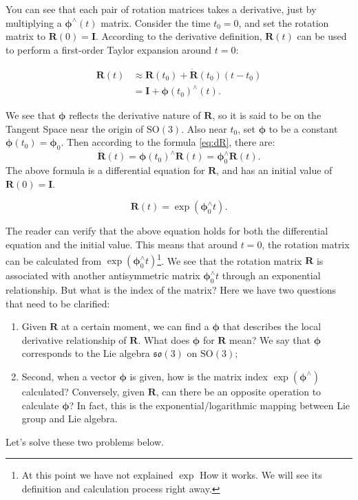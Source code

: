 You can see that each pair of rotation matrices takes a derivative, just by multiplying a $\boldsymbol{\phi}^\wedge (t)$ matrix. Consider the time $t_0=0$, and set the rotation matrix to $\bm{R}(0) = \bm{I}$. According to the derivative definition, $\bm{R}(t)$ can be used to perform a first-order Taylor expansion around $t=0$:

\begin{equation}
\begin{aligned}
\bm{R} \left( t \right) & \approx \bm{R} \left( t_0 \right) + \dot {\bm{R}} \left( {{t_0}} \right)\left ( {t - {t_0}} \right)\\
&= \bm{I} + \boldsymbol{\phi} {\left( {{t_0}} \right)^ \wedge } \left( t \right).
\end{aligned}
\end{equation}

We see that $\boldsymbol{\phi}$ reflects the derivative nature of $\bm{R}$, so it is said to be on the Tangent Space near the origin of $\mathrm{SO}(3)$. Also near $t_0$, set $\boldsymbol{\phi}$ to be a constant $\boldsymbol{\phi}(t_0) = \boldsymbol{\phi}_0$. Then according to the formula \eqref{eq:dR}, there are:
\[
\bm{ \dot{R} } (t) = \boldsymbol{\phi} (t_0) ^ {\wedge} \bm{R}(t) = \boldsymbol{\phi}_0^ {\wedge} \bm {R}(t).
\]
The above formula is a differential equation for $\bm{R}$, and has an initial value of $\bm{R}(0) = \bm{I}$.

\begin{equation}
\label{eq:so3ode}
\bm{R}(t) = \exp \left( \boldsymbol{\phi}_0^\wedge t \right).
\end{equation}

The reader can verify that the above equation holds for both the differential equation and the initial value. This means that around $t = 0$, the rotation matrix can be calculated from $\exp \left( \boldsymbol{\phi}_0^\wedge t \right)$\footnote{At this point we have not explained $\exp$ How it works. We will see its definition and calculation process right away. }. We see that the rotation matrix $\bm{R}$ is associated with another antisymmetric matrix $\boldsymbol{\phi}_0^\wedge t$ through an exponential relationship. But what is the index of the matrix? Here we have two questions that need to be clarified:

\begin{enumerate}
\item Given $\bm{R}$ at a certain moment, we can find a $\boldsymbol{\phi}$ that describes the local derivative relationship of $\bm{R}$. What does $\boldsymbol{\phi}$ for $\bm{R}$ mean? We say that $\boldsymbol{\phi}$ corresponds to the Lie algebra $\mathfrak{so}(3)$ on $\mathrm{SO}(3)$;
\item Second, when a vector $\boldsymbol{\phi}$ is given, how is the matrix index $\exp (\boldsymbol{\phi} ^\wedge )$ calculated? Conversely, given $\bm{R}$, can there be an opposite operation to calculate $\boldsymbol{\phi}$? In fact, this is the exponential/logarithmic mapping between Lie group and Lie algebra.
\end{enumerate}

Let's solve these two problems below.

